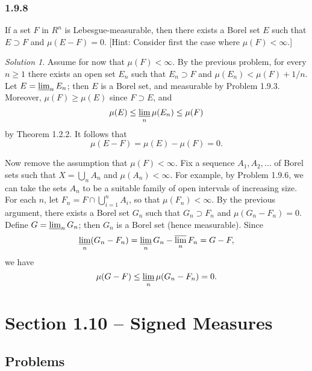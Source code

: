 \documentclass{report}
\theoremstyle{remark}
\newtheorem*{solution}{Solution}
\begin{document}
\subsubsection*{1.9.8}
If a set $F$ in $R^n$ is Lebesgue-measurable, then there exists a Borel set $E$ such that $E \supset F$ and $\mu(E - F) = 0$. [Hint: Consider first the case where $\mu(F) < \infty$.]

\begin{solution}
  Assume for now that $\mu(F) < \infty$. By the previous problem, for every $n \ge 1$ there exists an open set $E_n$ such that $E_n \supset F$ and $\mu(E_n) < \mu(F) + 1/n$. Let $E = \varliminf_n E_n$; then $E$ is a Borel set, and measurable by Problem 1.9.3. Moreover, $\mu(F) \ge \mu(E)$ since $F \supset E$, and
  \begin{equation*}
    \mu(E) \le \varliminf_n \mu(E_n) \le \mu(F)
  \end{equation*}
  by Theorem 1.2.2. It follows that
  \begin{equation*}
    \mu(E - F) = \mu(E) - \mu(F) = 0.
  \end{equation*}

  Now remove the assumption that $\mu(F) < \infty$. Fix a sequence $A_1, A_2, \dots$ of Borel sets such that $X = \bigcup_n A_n$ and $\mu(A_n) < \infty$. For example, by Problem 1.9.6, we can take the sets $A_n$ to be a suitable family of open intervals of increasing size. For each $n$, let $F_n = F \cap \bigcup_{i=1}^n A_i$, so that $\mu(F_n) < \infty$. By the previous argument, there exists a Borel set $G_n$ such that $G_n \supset F_n$ and $\mu(G_n - F_n) = 0$. Define $G = \varliminf_n G_n$; then $G_n$ is a Borel set (hence measurable). Since
  \begin{equation*}
    \varliminf_n (G_n - F_n) = \varliminf_n G_n - \varlimsup_n F_n = G - F,
  \end{equation*}
  we have
  \begin{equation*}
    \mu(G - F) \le \varliminf_n \mu(G_n - F_n) = 0.
  \end{equation*}
\end{solution}

\section*{Section 1.10 -- Signed Measures}

\subsection*{Problems}
\end{document}
